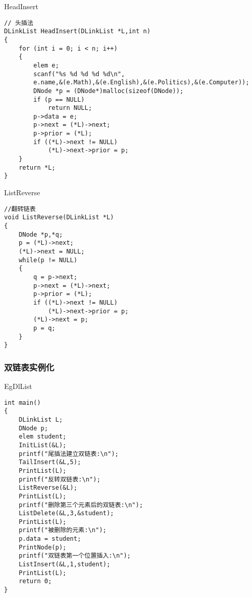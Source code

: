 \begin{macbox}{HeadInsert}
	\begin{verbatim}
// 头插法
DLinkList HeadInsert(DLinkList *L,int n)
{
    for (int i = 0; i < n; i++)
    {
        elem e;
        scanf("%s %d %d %d %d\n",
        e.name,&(e.Math),&(e.English),&(e.Politics),&(e.Computer));
        DNode *p = (DNode*)malloc(sizeof(DNode));
        if (p == NULL)
            return NULL;
        p->data = e;
        p->next = (*L)->next;
        p->prior = (*L);
        if ((*L)->next != NULL)
            (*L)->next->prior = p;
    }
    return *L;
}
    \end{verbatim}
\end{macbox}
\begin{macbox}{ListReverse}
	\begin{verbatim}
//翻转链表
void ListReverse(DLinkList *L)
{
    DNode *p,*q;
    p = (*L)->next;
    (*L)->next = NULL;
    while(p != NULL)
    {
        q = p->next;
        p->next = (*L)->next;
        p->prior = (*L);
        if ((*L)->next != NULL)
            (*L)->next->prior = p;
        (*L)->next = p;
        p = q;
    }
}   
    \end{verbatim}
\end{macbox}
\subsubsection{双链表实例化}
\begin{macbox}{EgDlList}
	\begin{verbatim}
int main()
{
    DLinkList L;
    DNode p;
    elem student;
    InitList(&L);
    printf("尾插法建立双链表:\n");
    TailInsert(&L,5);
    PrintList(L);
    printf("反转双链表:\n");
    ListReverse(&L);
    PrintList(L);
    printf("删除第三个元素后的双链表:\n");
    ListDelete(&L,3,&student);
    PrintList(L);
    printf("被删除的元素:\n");
    p.data = student;
    PrintNode(p);
    printf("双链表第一个位置插入:\n");
    ListInsert(&L,1,student);
    PrintList(L);
    return 0;
}
    \end{verbatim}
\end{macbox}

